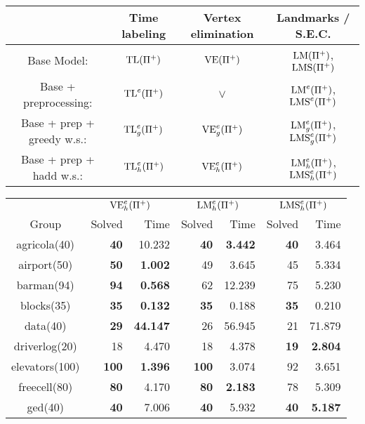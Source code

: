 \begin{center}
    \begin{tabular}{ |c|c|c|c| } 
      \hline
         & Time labeling & Vertex elimination & Landmarks / S.E.C. \\
      \hline
      Base Model: & $\mbox{TL}(\Pi^+)$ & $\mbox{VE}(\Pi^+)$ & $\mbox{LM}(\Pi^+)$, $\mbox{LMS}(\Pi^+)$ \\
      \hline
      Base + preprocessing: & $\mbox{TL}^e(\Pi^+)$ & $\vee$ & $\mbox{LM}^e(\Pi^+)$, $\mbox{LMS}^e(\Pi^+)$ \\
      \hline
      Base + prep + greedy w.s.: & $\mbox{TL}^e_g(\Pi^+)$ & $\mbox{VE}^e_g(\Pi^+)$ & $\mbox{LM}^e_g(\Pi^+)$, $\mbox{LMS}^e_g(\Pi^+)$ \\
      \hline
      Base + prep + hadd w.s.: & $\mbox{TL}^e_h(\Pi^+)$ & $\mbox{VE}^e_h(\Pi^+)$ & $\mbox{LM}^e_h(\Pi^+)$, $\mbox{LMS}^e_h(\Pi^+)$ \\
      \hline
    \end{tabular}
\end{center}
\begin{center}
  \begin{tabular}{c rr rr rr}
    \toprule
    & \multicolumn{2}{c}{$\mbox{VE}^e_h(\Pi^+)$} & \multicolumn{2}{c}{$\mbox{LM}^e_h(\Pi^+)$} & \multicolumn{2}{c}{$\mbox{LMS}^e_h(\Pi^+)$} \\
    \cmidrule(lr){2-3} \cmidrule(lr){4-5} \cmidrule(lr){6-7}
    Group & Solved & Time & Solved & Time & Solved & Time \\
    \midrule
    agricola(40)    & \textbf{40}   & 10.232            & \textbf{40}   & \textbf{3.442}      & \textbf{40}   & 3.464 \\
    airport(50)     & \textbf{50}   & \textbf{1.002}    & 49            & 3.645               & 45            & 5.334 \\
    barman(94)      & \textbf{94}   & \textbf{0.568}    & 62            & 12.239              & 75            & 5.230 \\
    blocks(35)      & \textbf{35}   & \textbf{0.132}    & \textbf{35}   & 0.188               & \textbf{35}   & 0.210 \\
    data(40)        & \textbf{29}   & \textbf{44.147}   & 26            & 56.945              & 21            & 71.879 \\
    driverlog(20)   & 18            & 4.470             & 18            & 4.378               & \textbf{19}   & \textbf{2.804} \\
    elevators(100)  & \textbf{100}  & \textbf{1.396}    & \textbf{100}  & 3.074               & 92            & 3.651 \\
    freecell(80)    & \textbf{80}   & 4.170             & \textbf{80}   & \textbf{2.183}      & 78            & 5.309 \\
    ged(40)         & \textbf{40}   & 7.006             & \textbf{40}   & 5.932               & \textbf{40}   & \textbf{5.187} \\

\end{tabular}
\end{center}
